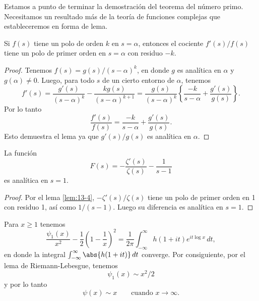 \documentclass[12pt,a4paper]{book}
\begin{document}
    Estamos a punto de terminar la demostración del teorema del número primo. Necesitamos un
    resultado más de la teoría de funciones complejas que estableceremos en forma de lema.

    \begin{lema}\label{lem:13-4}
        Si $f(s)$ tiene un polo de orden $k$ en $s=\alpha$, entonces el cociente $f'(s)/f(s)$
        tiene un polo de primer orden en $s=\alpha$ con residuo $-k$.
    \end{lema}

    \begin{proof}
        Tenemos $f(s)=g(s)/(s-\alpha)^{k}$, en donde $g$ es analítica en $\alpha$ y
        $g(\alpha)\neq0$. Luego, para todo $s$ de un cierto entorno de $\alpha$, tenemos
        \begin{equation*}
            f'(s)=\frac{g'(s)}{(s-\alpha)^{k}}-\frac{kg(s)}{(s-\alpha)^{k+1}}=\frac{g(s)}{(s-\alpha)^{k}}\left\{\frac{-k}{s-\alpha}+\frac{g'(s)}{g(s)}\right\}.
        \end{equation*}
        Por lo tanto
        \begin{equation*}
            \frac{f'(s)}{f(s)}=\frac{-k}{s-\alpha}+\frac{g'(s)}{g(s)}.
        \end{equation*}
        Esto demuestra el lema ya que $g'(s)/g(s)$ es analítica en $\alpha$.
    \end{proof}

    \begin{teorema}\label{teo:13-8}
        La función
        \begin{equation*}
            F(s)=-\frac{\zeta'(s)}{\zeta(s)}-\frac{1}{s-1}
        \end{equation*}
        es analítica en $s=1$.
    \end{teorema}

    \begin{proof}
        Por el lema \ref{lem:13-4}, $-\zeta'(s)/\zeta(s)$ tiene un polo de primer orden en 1 con
        residuo 1, así como $1/(s-1)$. Luego su diferencia es analítica en $s=1$.
    \end{proof}

    \begin{teorema}\label{teo:13-9}
        Para $x\geq1$ tenemos
        \begin{equation*}
            \frac{\psi_{1}(x)}{x^{2}}-\frac{1}{2}\left(1-\frac{1}{x}\right)^{2}=\frac{1}{2\pi}\int_{-\infty}^{\infty}h(1+it)e^{it\log x}\,dt,
        \end{equation*}
        en donde la integral $\int_{-\infty}^{\infty}\abs{h(1+it)}\,dt$ converge. Por
        consiguiente, por el lema de Riemann-Lebesgue, tenemos
        \begin{equation}\label{eq:13-24}
            \psi_{1}(x)\sim x^{2}/2
        \end{equation}
        y por lo tanto
        \begin{equation*}
            \psi(x)\sim x\qquad\text{cuando }x\to\infty.
        \end{equation*}
    \end{teorema}
\end{document}
